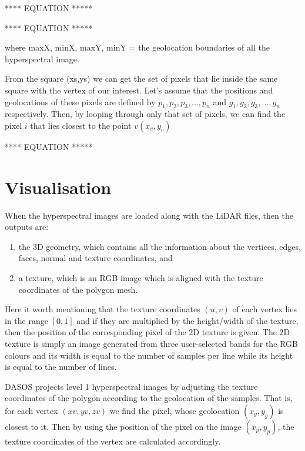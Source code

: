 \documentclass{subfiles}
\begin{document}
	**** EQUATION *****
	
	**** EQUATION *****
	\par where maxX, minX, maxY, minY = the geolocation boundaries of all the hyperspectral image.
	
	\par From the square (xs,ys) we can get the set of pixels that lie inside the same square with the vertex of our interest. Let’s assume that the positions and geolocations of these pixels are defined by $p_1	, p_2 , p_3, ... , p_n$ and $g_1, g_2, g_3 , ... , g_n$ respectively. Then, by looping through only that set of pixels, we can find the pixel $i$ that lies closest to the point $v(x_v , y_v)$
	
	**** EQUATION *****
	

	
	
		
\section{Visualisation}
	\par When the hyperspectral images are loaded along with the LiDAR files, then the outputs are: 	
	\begin{enumerate}
		\item the 3D geometry, which contains all the information about the vertices, edges, faces, normal and texture coordinates, and
		\item  a texture, which is an RGB image which is aligned with the texture coordinates of the polygon mesh.
	\end{enumerate}
	
	\par Here it worth mentioning that the texture coordinates $(u, v)$ of each vertex lies in the range $[0, 1]$ and if they are multiplied by the height/width of the texture, then the position of the corresponding pixel of the 2D texture is given. The 2D texture is simply an image generated from three user-selected bands for the RGB colours and its width is equal to the number of samples per line while its height is equal to the number of lines.
				
					
	\par DASOS projects level 1 hyperspectral images by adjusting the texture coordinates of the polygon according to the geolocation of the samples. That is, for each vertex $(xv, yv , zv)$ we find the pixel, whose geolocation $(x_g, y_g )$ is closest to it. Then by using the position of the pixel on the image $(x_p, y_p)$, the texture coordinates of the vertex are calculated accordingly.
				
\end{document}
